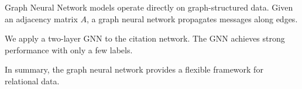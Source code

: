Graph Neural Network models operate directly on graph-structured data. Given an adjacency matrix $A$, a graph neural network propagates messages along edges.

We apply a two-layer GNN to the citation network. The GNN achieves strong performance with only a few labels.

In summary, the graph neural network provides a flexible framework for relational data.
